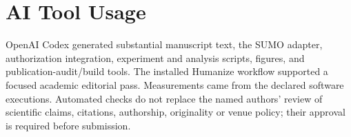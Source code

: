 \documentclass[conference,letterpaper]{IEEEtran}
\begin{document}
\section*{AI Tool Usage}
OpenAI Codex generated substantial manuscript text, the SUMO adapter,
authorization integration, experiment and analysis scripts, figures, and
publication-audit/build tools. The installed Humanize workflow supported a
focused academic editorial pass. Measurements came from the declared software
executions. Automated checks do not replace the named authors' review of
scientific claims, citations, authorship, originality or venue policy; their
approval is required before submission.



\end{document}
